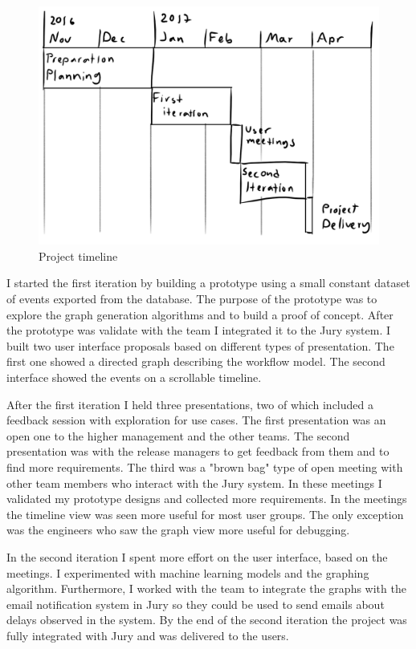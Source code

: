 \begin{figure}[htb]
\centering \includegraphics[width=0.9\linewidth]{gfx/figures/projecttimeline.png}
\caption{Project timeline}
\label{fig:projecttimeline}
\end{figure}

I started the first iteration by building a prototype using a small constant dataset of events exported from the database. The purpose of the prototype was to explore the graph generation algorithms and to build a proof of concept. After the prototype was validate with the team I integrated it to the Jury system. I built two user interface proposals based on different types of presentation. The first one showed a directed graph describing the workflow model. The second interface showed the events on a scrollable timeline.

After the first iteration I held three presentations, two of which included a feedback session with exploration for use cases. The first presentation was an open one to the higher management and the other teams. The second presentation was with the release managers to get feedback from them and to find more requirements. The third was a "brown bag" type of open meeting with other team members who interact with the Jury system.
In these meetings I validated my prototype designs and collected more requirements.
In the meetings the timeline view was seen more useful for most user groups.
The only exception was the engineers who saw the graph view more useful for debugging.

In the second iteration I spent more effort on the user interface, based on the meetings.
I experimented with machine learning models and the graphing algorithm.
Furthermore, I worked with the team to integrate the graphs with the email notification system in Jury so they could be used to send emails about delays observed in the system. 
By the end of the second iteration the project was fully integrated with Jury and was delivered to the users.